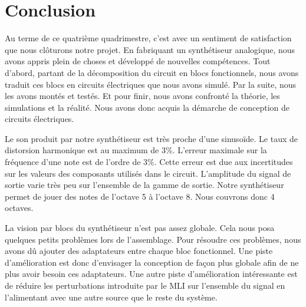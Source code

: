 \chapter{Conclusion}
Au terme de ce quatrième quadrimestre, c'est avec un sentiment de satisfaction
que nous clôturons notre projet. En fabriquant un synthétiseur analogique,
nous avons appris plein de choses et développé de nouvelles compétences.
Tout d'abord, partant de la décomposition du circuit en blocs fonctionnels,
nous avons traduit ces blocs en circuits électriques que nous avons simulé.
Par la suite, nous les avons montés et testés. Et pour finir, nous avons confronté
la théorie, les simulations et la réalité. Nous avons donc acquis la démarche de
conception de circuits électriques.

Le son produit par notre synthétiseur est très proche d'une sinusoïde. Le taux de
distorsion harmonique est au maximum de 3\%. L'erreur maximale sur la fréquence
d'une note est de l'ordre de 3\%. Cette erreur est due aux incertitudes sur les
valeurs des composants utilisés dans le circuit.
L'amplitude du signal de sortie varie très peu sur l'ensemble de la gamme de sortie.
Notre synthétiseur permet de jouer des notes de l'octave 5 à l'octave 8. 
Nous couvrons donc 4 octaves.

La vision par blocs du synthétiseur n'est pas assez globale. Cela nous posa
quelques petits problèmes lors de l'assemblage. Pour résoudre ces problèmes, 
nous avons dû ajouter des adaptateurs entre chaque bloc fonctionnel. Une piste
d'amélioration est donc d'envisager la conception de façon plus globale afin
de ne plus avoir besoin ces adaptateurs. Une autre piste d'amélioration intéressante
est de réduire les perturbations introduite par le MLI sur l'ensemble du signal en 
l'alimentant avec une autre source que le reste du système.
